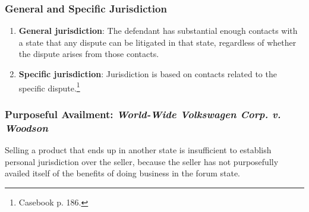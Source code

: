\subsubsection{General and Specific Jurisdiction}

\begin{enumerate}
    \item \textbf{General jurisdiction}: The defendant has substantial enough 
    contacts with a state that any dispute can be litigated in that state, 
    regardless of whether the dispute arises from those contacts.
    \item \textbf{Specific jurisdiction}: Jurisdiction is based on contacts related to 
    the specific dispute.\footnote{Casebook p. 186.}
\end{enumerate}

\subsubsection{Purposeful Availment: \emph{World-Wide Volkswagen Corp. v. Woodson}}

Selling a product that ends up in another state is insufficient to establish 
personal jurisdiction over the seller, because the seller has not purposefully 
availed itself of the benefits of doing business in the forum state.

